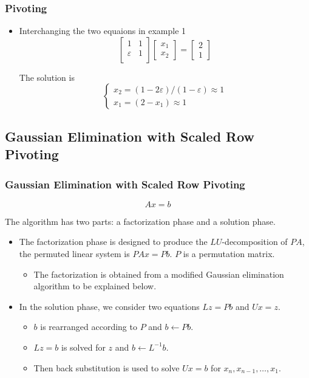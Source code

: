 \documentclass[notheorems,mathserif,table,compress]{beamer}  %
\begin{document}
\begin{frame}
\frametitle{Pivoting} 
\begin{itemize}
\item Interchanging the two equaions in example 1
\begin{displaymath}
\begin{bmatrix}
1 & 1\\
\varepsilon & 1\\
\end{bmatrix}
\begin{bmatrix}
x_1\\
x_2
\end{bmatrix}=
\begin{bmatrix}
2\\
1
\end{bmatrix}
\end{displaymath}

The solution is 
\begin{displaymath}
\left\{ \begin{array}{ll}
x_2=(1-2\varepsilon)/(1-\varepsilon)\approx 1\\
x_1=(2-x_1)\approx 1
\end{array} \right.
\end{displaymath}

\end{itemize}
\end{frame}

\subsection{Gaussian Elimination with Scaled Row Pivoting}

\begin{frame}
\frametitle{Gaussian Elimination with Scaled Row Pivoting}
\begin{displaymath}
Ax=b
\end{displaymath} 

The algorithm has two parts: a \textsf{factorization phase} and a \textsf{solution phase}.
\begin{itemize}
\item The factorization phase is designed to produce the $LU$-decomposition of $PA$, the permuted linear system is $PAx=Pb$. $P$ is a permutation matrix.
\begin{itemize}
\item The factorization is obtained from a modified Gaussian elimination algorithm to be explained below.
\end{itemize}
\item In the solution phase, we consider two equations $Lz=Pb$ and $Ux=z$.
\begin{itemize}
\item $b$ is rearranged according to $P$ and $b\leftarrow Pb$.
\item $Lz=b$ is solved for $z$ and $b\leftarrow L^{-1}b$.
\item Then back substitution is used to solve $Ux=b$ for $x_n, x_{n-1}, \ldots, x_1$.
\end{itemize}

\end{itemize}
\end{frame}
\end{document}
